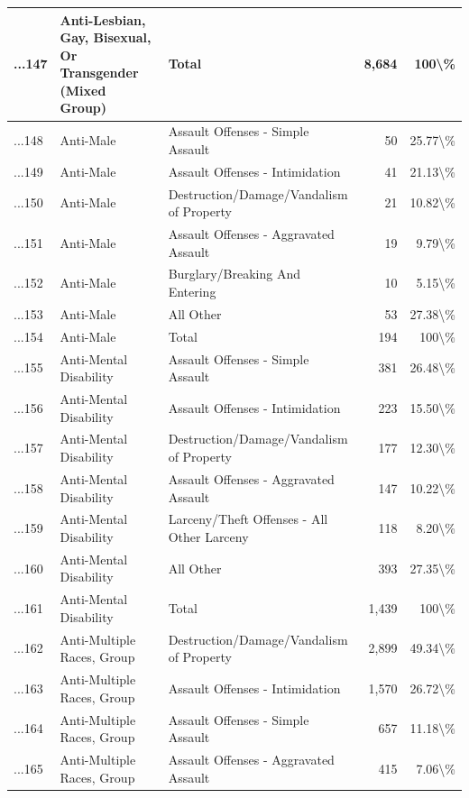 \documentclass[
]{krantz}
\begin{document}
\begin{longtable}[t]{l|l|l|r|r}
...147 & Anti-Lesbian, Gay, Bisexual, Or Transgender (Mixed Group) & Total & 8,684 & 100\textbackslash{}\%\\
\hline
...148 & Anti-Male & Assault Offenses - Simple Assault & 50 & 25.77\textbackslash{}\%\\
\hline
...149 & Anti-Male & Assault Offenses - Intimidation & 41 & 21.13\textbackslash{}\%\\
\hline
...150 & Anti-Male & Destruction/Damage/Vandalism of Property & 21 & 10.82\textbackslash{}\%\\
\hline
...151 & Anti-Male & Assault Offenses - Aggravated Assault & 19 & 9.79\textbackslash{}\%\\
\hline
...152 & Anti-Male & Burglary/Breaking And Entering & 10 & 5.15\textbackslash{}\%\\
\hline
...153 & Anti-Male & All Other & 53 & 27.38\textbackslash{}\%\\
\hline
...154 & Anti-Male & Total & 194 & 100\textbackslash{}\%\\
\hline
...155 & Anti-Mental Disability & Assault Offenses - Simple Assault & 381 & 26.48\textbackslash{}\%\\
\hline
...156 & Anti-Mental Disability & Assault Offenses - Intimidation & 223 & 15.50\textbackslash{}\%\\
\hline
...157 & Anti-Mental Disability & Destruction/Damage/Vandalism of Property & 177 & 12.30\textbackslash{}\%\\
\hline
...158 & Anti-Mental Disability & Assault Offenses - Aggravated Assault & 147 & 10.22\textbackslash{}\%\\
\hline
...159 & Anti-Mental Disability & Larceny/Theft Offenses - All Other Larceny & 118 & 8.20\textbackslash{}\%\\
\hline
...160 & Anti-Mental Disability & All Other & 393 & 27.35\textbackslash{}\%\\
\hline
...161 & Anti-Mental Disability & Total & 1,439 & 100\textbackslash{}\%\\
\hline
...162 & Anti-Multiple Races, Group & Destruction/Damage/Vandalism of Property & 2,899 & 49.34\textbackslash{}\%\\
\hline
...163 & Anti-Multiple Races, Group & Assault Offenses - Intimidation & 1,570 & 26.72\textbackslash{}\%\\
\hline
...164 & Anti-Multiple Races, Group & Assault Offenses - Simple Assault & 657 & 11.18\textbackslash{}\%\\
\hline
...165 & Anti-Multiple Races, Group & Assault Offenses - Aggravated Assault & 415 & 7.06\textbackslash{}\%\\

\end{longtable}
\end{document}
